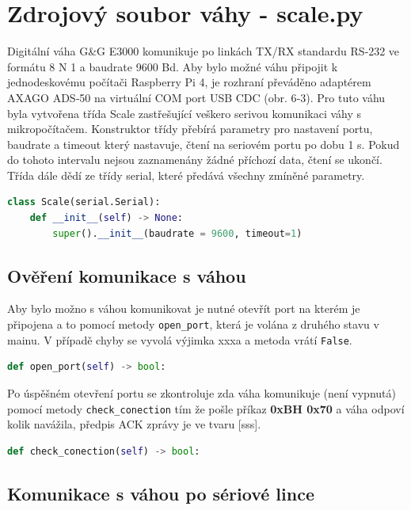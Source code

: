 \section{Zdrojový soubor váhy - scale.py}
Digitální váha G\&G E3000 komunikuje po linkách TX/RX standardu RS‑232 ve formátu 8 N 1 a baudrate 9600 Bd. Aby bylo možné váhu připojit k jednodeskovému počítači Raspberry Pi 4, je rozhraní převáděno adaptérem AXAGO ADS‑50 na virtuální COM port USB CDC (obr. 6‑3). Pro tuto váhu byla vytvořena třída Scale zastřešující veškero serivou komunikaci váhy s mikropočítačem. Konstruktor třídy přebírá parametry pro nastavení portu, baudrate a timeout který nastavuje, čtení na seriovém portu po dobu 1 s. Pokud do tohoto intervalu nejsou zaznamenány žádné příchozí data, čtení se ukončí. Třída dále dědí ze třídy serial, které předává všechny zmíněné parametry.

\begin{lstlisting}[language=Python,breaklines=false, frame=single]
class Scale(serial.Serial):
    def __init__(self) -> None:
        super().__init__(baudrate = 9600, timeout=1)
\end{lstlisting}

\subsection{Ověření komunikace s váhou}
Aby bylo možno s váhou komunikovat je nutné otevřít port na kterém je připojena a to pomocí metody \texttt{open\_port}, která je volána z druhého stavu v mainu. V případě chyby se vyvolá výjimka xxxa a metoda vrátí \texttt{False}.

\begin{lstlisting}[language=Python,breaklines=false, frame=single]
def open_port(self) -> bool:
\end{lstlisting}

Po úspěšném otevření portu se zkontroluje zda váha komunikuje (není vypnutá) pomocí metody \texttt{check\_conection} tím že pošle příkaz \textbf{0xBH 0x70} a váha odpoví kolik navážila, předpis ACK zprávy je ve tvaru [sss].

\begin{lstlisting}[language=Python,breaklines=false, frame=single]
def check_conection(self) -> bool:
\end{lstlisting}

\subsection{Komunikace s váhou po sériové lince}

